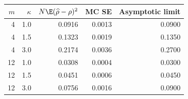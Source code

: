 \begin{tabular}{rrrrr}
\toprule
$m$ & $\kappa$ & $N\E(\widehat\rho-\rho)^2$ & MC SE & Asymptotic limit \\
\midrule
4 & 1.0 & 0.0916 & 0.0013 & 0.0900 \\
4 & 1.5 & 0.1323 & 0.0019 & 0.1350 \\
4 & 3.0 & 0.2174 & 0.0036 & 0.2700 \\
12 & 1.0 & 0.0308 & 0.0004 & 0.0300 \\
12 & 1.5 & 0.0451 & 0.0006 & 0.0450 \\
12 & 3.0 & 0.0756 & 0.0016 & 0.0900 \\
\bottomrule
\end{tabular}
